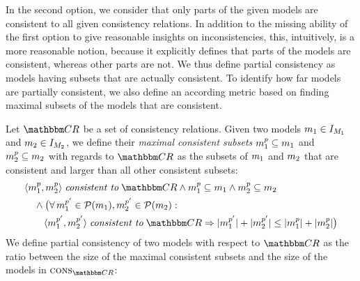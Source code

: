 In the second option, we consider that only parts of the given models are consistent to all given consistency relations.
In addition to the missing ability of the first option to give reasonable insights on inconsistencies, this, intuitively, is a more reasonable notion, because it explicitly defines that parts of the models are consistent, whereas other parts are not.
We thus define partial consistency as models having subsets that are actually consistent.
To identify how far models are partially consistent, we also define an according metric based on finding maximal subsets of the models that are consistent.

\begin{definition} \label{def:partialconsistency}
    Let $\consistencyrelationset{CR}$ be a set of consistency relations.
    Given two models $\model{m}{1} \in \metamodelinstanceset{M}{1}$ and $\model{m}{2} \in \metamodelinstanceset{M}{2}$, we define their \emph{maximal consistent subsets} $\model{m}{1}^p \subseteq \model{m}{1}$ and $\model{m}{2}^p \subseteq \model{m}{2}$ with regards to $\consistencyrelationset{CR}$ as the subsets of $\model{m}{1}$ and $\model{m}{2}$ that are consistent and larger than all other consistent subsets:
    \begin{align*}
        & 
        \tupled{\model{m}{1}^p, \model{m}{2}^p} \consistenttomath \consistencyrelationset{CR} \land
        \model{m}{1}^p \subseteq \model{m}{1} \land \model{m}{2}^p \subseteq \model{m}{2}  \\
        & \formulaskip
        \land 
        \bigl( \forall \model{m}{1}^{p'} \in \mathcal{P}(\model{m}{1}), \model{m}{2}^{p'} \in \mathcal{P}(\model{m}{2}) : \\ %
        & \formulaskip\formulaskip
        \tupled{\model{m}{1}^{p'}, \model{m}{2}^{p'}} \consistenttomath \consistencyrelationset{CR} %
        \Rightarrow 
        \abs{\model{m}{1}^{p'}} + \abs{\model{m}{2}^{p'}} \leq \abs{\model{m}{1}^{p}} + \abs{\model{m}{2}^{p}} \bigr)
    \end{align*}
    We define partial consistency of two models with respect to $\consistencyrelationset{CR}$ as the ratio between the size of the maximal consistent subsets and the size of the models in $\function{cons}_{\consistencyrelationset{CR}}$:

\end{definition}
